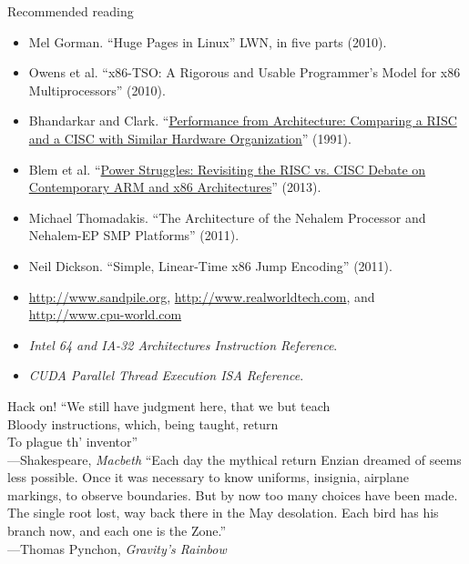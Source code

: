 \documentclass[mathserif,xcolor={dvipsnames,table}]{beamer}
\begin{document}
\begin{frame}{Recommended reading}
\footnotesize{
\begin{itemize}
\item Mel Gorman. ``Huge Pages in Linux'' LWN, in five parts (2010).
\item Owens et al. ``x86-TSO: A Rigorous and Usable Programmer's Model for x86 Multiprocessors'' (2010).
\item Bhandarkar and Clark. ``\href{http://dl.acm.org/citation.cfm?id=107003}{Performance from Architecture: Comparing a
RISC and a CISC with Similar Hardware Organization}'' (1991).
\vfill
\item Blem et al. ``\href{http://research.cs.wisc.edu/vertical/papers/2013/hpca13-isa-power-struggles.pdf}{Power Struggles: Revisiting the RISC vs. CISC Debate on
Contemporary ARM and x86 Architectures}'' (2013).
\vfill
\item Michael Thomadakis. ``The Architecture of the Nehalem Processor and
Nehalem-EP SMP Platforms'' (2011).
\vfill
\item Neil Dickson. ``Simple, Linear-Time x86 Jump Encoding'' (2011).
\vfill
\item \href{http://www.sandpile.org}{http://www.sandpile.org},
\href{http://www.realworldtech.com}{http://www.realworldtech.com}, and
\href{http://www.cpu-world.com}{http://www.cpu-world.com}
\vfill
\item \textit{Intel 64 and IA-32 Architectures Instruction Reference}.
\vfill
\item \textit{CUDA Parallel Thread Execution ISA Reference}.
\end{itemize}
}
\end{frame}

\begin{frame}{Hack on!}
``We still have judgment here, that we but teach\\
Bloody instructions, which, being taught, return\\
To plague th' inventor''\\
\hfill---Shakespeare, \textit{Macbeth}
\vfill
\justifying ``Each day the mythical return Enzian dreamed of seems less possible. Once it
was necessary to know uniforms, insignia, airplane markings, to observe
boundaries. But by now too many choices have been made. The single root lost,
way back there in the May desolation. Each bird has his branch now, and each
one is the Zone.''\\
\hfill---Thomas Pynchon, \textit{Gravity's Rainbow}
\end{frame}
\end{document}
